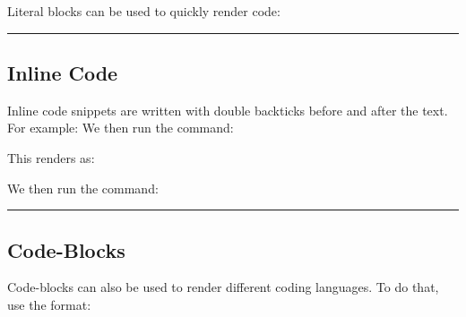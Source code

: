 \documentclass[letterpaper,10pt,english]{sphinxmanual}
\begin{document}
\begin{sphinxVerbatim}[commandchars=\\\{\}]

        
             
        
              
\end{sphinxVerbatim}

Literal blocks can be used to quickly render code:

\begin{sphinxVerbatim}[commandchars=\\\{\}]

     
\end{sphinxVerbatim}


\bigskip\hrule\bigskip



\subsection{Inline Code}
\label{\detokenize{guide/99_rst-guide:inline-code}}
Inline code snippets are written with double backticks before and after the text.
For example:
We then run the command: 

This renders as:

We then run the command: 


\bigskip\hrule\bigskip



\subsection{Code-Blocks}
\label{\detokenize{guide/99_rst-guide:code-blocks}}
Code-blocks can also be used to render different coding languages.
To do that, use the format:
\end{document}
